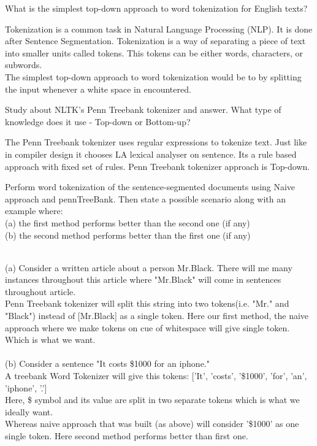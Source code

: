 \documentclass[11pt]{exam}
\begin{document}
\begin{questions}
\question What is the simplest top-down approach to word tokenization for English texts?
\begin{solution}
    Tokenization is a common task in Natural Language Processing (NLP). It is done after Sentence Segmentation. Tokenization is a way of separating a piece of text into smaller units called tokens. This tokens can be either words, characters, or subwords.\\
    The simplest top-down approach to word tokenization would be to by splitting the input whenever a white space in encountered.
\end{solution}

\question Study about NLTK’s Penn Treebank tokenizer and answer. What type of knowledge does it use
- Top-down or Bottom-up?
\begin{solution}
    The Penn Treebank tokenizer uses regular expressions to tokenize text. Just like in compiler design it chooses LA lexical analyser on sentence. Its a rule based approach with fixed set of rules. Penn Treebank tokenizer approach is Top-down.
    
\end{solution}

\question Perform word tokenization of the sentence-segmented documents using Naive approach and pennTreeBank. Then state a possible scenario along with an example where:\\
(a) the first method performs better than the second one (if any)\\
(b) the second method performs better than the first one (if any)
\begin{solution}\\
    (a) Consider a written article about a person Mr.Black. There will me many instances throughout this article where "Mr.Black" will come in sentences throughout article.\\
    Penn Treebank tokenizer will split this string into two tokens(i.e. "Mr." and "Black") instead of [Mr.Black] as a single token. Here our first method, the naive approach where we make tokens on cue of whitespace will give single token. Which is what we want.\\\\
        (b) Consider a sentence "It costs \$1000 for an iphone."\\
    A treebank Word Tokenizer will give this tokens: ['It', 'costs', '\$1000', 'for', 'an', 'iphone', '.']\\
    Here, \$ symbol and its value are split in two separate tokens which is what we ideally want.\\
    Whereas naive approach that was built (as above) will consider '\$1000' as one single token.
    Here second method performs better than first one.
\end{solution}


\end{questions}
\end{document}
